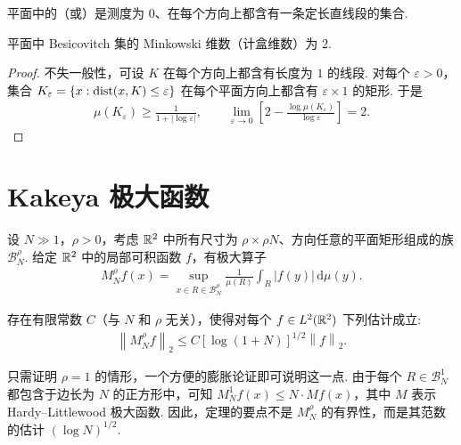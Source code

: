 \begin{definition}\label{def:3.5}
平面中的（或）是测度为 $0$、在每个方向上都含有一条定长直线段的集合.
\end{definition}

\begin{corollary}\label{cor:3.6}
平面中 Besicovitch 集的 Minkowski 维数（计盒维数）为 $2$.
\end{corollary}

\begin{proof}
不失一般性，可设 $K$ 在每个方向上都含有长度为 $1$ 的线段. 对每个 $\varepsilon > 0$，集合 $K_{\varepsilon} = \{x : \operatorname{dist}(x, K) \leq \varepsilon\}$ 在每个平面方向上都含有 $\varepsilon \times 1$ 的矩形. 于是
\begin{align*}
  \mu(K_{\varepsilon})\geq\frac{1}{1+|\log\varepsilon|},\qquad
  \lim_{\varepsilon\to 0}\left[2-\frac{\log\mu(K_{\varepsilon})}{\log\varepsilon}\right]=2.
\end{align*}
\end{proof}

\section{Kakeya 极大函数}

设 $N \gg 1$，$\rho > 0$，考虑 $\mathbb{R}^2$ 中所有尺寸为 $\rho \times \rho N$、方向任意的平面矩形组成的族 $\mathcal{B}_N^\rho$. 给定 $\mathbb{R}^2$ 中的局部可积函数 $f$，有极大算子
\begin{align*}
  M_{N}^{\rho}f(x)=\sup_{x\in R\in\mathcal{B}_{N}^{\rho}}\frac{1}{\mu(R)}\int_{R}\left|f(y)\right|\,\mathrm{d}\mu(y).
\end{align*}

\begin{theorem}\label{thm:3.7}
存在有限常数 $C$（与 $N$ 和 $\rho$ 无关），使得对每个 $f \in L^2(\mathbb{R}^2)$ 下列估计成立:
\begin{align*}
  \left\|M_{N}^{\rho}f\right\|_{2}\leq C\left[\log(1+N)\right]^{1/2}\left\|f\right\|_{2}.
\end{align*}
\end{theorem}

\begin{remark}\label{rem:3.8}
只需证明 $\rho = 1$ 的情形，一个方便的膨胀论证即可说明这一点. 由于每个 $R \in \mathcal{B}_N^1$ 都包含于边长为 $N$ 的正方形中，可知 $M_N^1 f(x) \leq N \cdot M f(x)$，其中 $M$ 表示 Hardy--Littlewood 极大函数. 因此，定理的要点不是 $M_N^\rho$ 的有界性，而是其范数的估计 $(\log N)^{1/2}$.
\end{remark}

